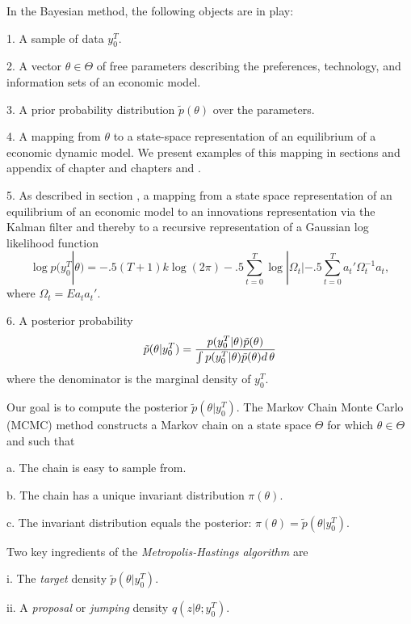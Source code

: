 In the Bayesian method, the following objects are in play:
\medskip
\item{1.} A sample of data $y_0^T$.
\medskip
\item {2.} A vector $\theta \in \Theta$ of free parameters  describing the preferences, technology, and information sets
of an economic model.
\medskip
\item{3.} A prior probability distribution $\tilde p(\theta)$ over the parameters.
\medskip
\item {4.} A mapping from $\theta$ to a state-space representation of an equilibrium of a economic dynamic model.
We present examples of this mapping in sections   and appendix   of chapter  and chapters   and .
\medskip
\item{5.} As described in section ,
a mapping from a state space representation of an equilibrium of an economic model to an innovations representation
via the Kalman filter and thereby to a recursive representation of a Gaussian log likelihood function
$$\log p(y^T_0| \theta ) = %
   -.5(T+1)k \log (2\pi) -.5 \sum_{t=0}^T \log | \Omega_t|
 - .5 \sum_{t=0}^T a_t' \Omega_t^{-1} a_t ,$$
  where $\Omega_t = E a_t a_t'$.
\medskip

\item{6.} A posterior probability $$\tilde p(\theta| y^T_0) =
 {p(y^T_0| \theta ) \tilde p(\theta) \over \int p(y^T_0| \theta )  \tilde p(\theta) d\, \theta}$$
 where the denominator is the marginal density of $y_0^T$.


\medskip {}%
Our goal is to compute the posterior $\tilde p(\theta| y^T_0).$
The Markov Chain Monte Carlo (MCMC) method constructs a Markov chain on a state space $\Theta$ for which
$\theta \in \Theta$ and such that
\medskip
\item{a.} The chain is easy to sample from.
\medskip
\item{b.} The chain has a unique invariant distribution $\pi(\theta)$.
\medskip
\item{c.} The invariant distribution equals the posterior:  $\pi(\theta) = \tilde p(\theta|y^T_0)$.

\medskip

\noindent Two key ingredients of the {\it Metropolis-Hastings algorithm\/} are
\medskip
\item{i.} The {\it target\/} density $\tilde p(\theta|y^T_0)$.
\medskip
\item{ii.} A {\it proposal\/} or {\it jumping\/} density $q(z|\theta;y^T_0)$.
\medskip


